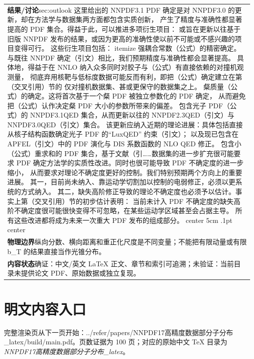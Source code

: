\documentclass[UTF8,11pt,oneside]{ctexbook}
\begin{document}
\begin{table}[htbp]
\begin{tabular}{@{}p{}@{}}
    \textbf{结果/讨论}\quad sec:outlook 这里给出的 NNPDF3.1 PDF 确定是对 NNPDF3.0 的更新，却在方法学与数据集两方面都包含实质创新， 产生了精度与准确性都显著提高的 PDF 集合。得益于此，可以推进多项衍生项目： 或旨在更新以往基于旧版 NNPDF 发布的结果，或因为更高的准确性使以前不可能或不感兴趣的项目变得可行。 这些衍生项目包括： itemize 强耦合常数（公式）的精密确定。 与既往 NNPDF 确定（引文）相比，我们预期精度与准确性都会显著提高。 具体地，得益于在 NNLO 纳入众多同时对胶子与（公式）有直接依赖的对撞机观测量， 彻底弃用核靶与低标度数据可能反而有利，即把（公式）确定建立在第（交叉引用）节的 仅对撞机数据集、甚或更保守的数据集之上。 粲质量（公式）的确定。这将首次基于一个粲 PDF 被独立参数化的 PDF 确定， 从而避免把（公式）认作决定粲 PDF 大小的参数所带来的偏差。 包含光子 PDF（公式）的 NNPDF3.1QED 集合，从而更新以往的 NNPDF2.3QED（引文）与 NNPDF3.0QED（引文）集合。 该更新应纳入近期的理论进展：具体包括直接从核子结构函数确定光子 PDF 的“LuxQED” 约束（引文）； 以及现已包含在 APFEL（引文）中的 PDF 演化与 DIS 系数函数的 NLO QED 修正。 包含小（公式）重求和的 PDF 集合，基于文献（引……数据集的进一步扩充很可能要求 PDF 确定方法学的实质性改进。同时也很可能导致 PDF 不确定度的进一步缩小， 从而要求对理论不确定度更好的控制。我们特别预期两个方向上的重要进展。 其一，目前尚未纳入、靠运动学切割加以控制的电弱修正，必须以更系统的方式纳入。 其二，缺失高阶修正导致的理论不确定度也必须予以估计。事实上第（交叉引用）节的初步估计表明： 当前未计入 PDF 不确定度的缺失高阶不确定度很可能很快变得不可忽略，在某些运动学区域甚至会占据主导。 所有这些改进都将成为未来一次重大 PDF 发布的组成部分。 center 5cm .1pt center \\
    \textbf{物理边界}\quad 纵向分数、横向距离和重正化尺度是不同变量；不能把有限动量或有限 b\_T 的结果直接当作光锥分布。 \\
    \textbf{内容状态}\quad 确证：中文/英文 LaTeX 正文、章节和索引可追溯；未验证：当前目录未提供论文 PDF、原始数据或独立复现。 \\
    \bottomrule
  \end{tabular}
\end{table}
\section*{明文内容入口}
\noindent 完整渲染页从下一页开始：../\allowbreak{}refer/\allowbreak{}papers/\allowbreak{}NNPDF17高精度数据部分子分布\_\allowbreak{}latex/\allowbreak{}build/\allowbreak{}main.pdf。页数证据为 100 页；对应的原始中文 TeX 目录为 \emph{NNPDF17高精度数据部分子分布\_latex}。
\clearpage

\clearpage
\end{document}
